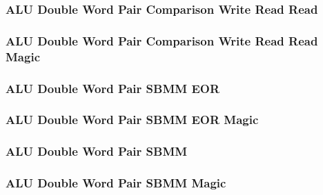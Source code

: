 \subsubsection[{\small ALU Double Word Pair Comparison Write Read Read}]{ALU Double Word Pair Comparison Write Read Read} \label{sec:format-ALU-DPCWRR}



\subsubsection[{\small ALU Double Word Pair Comparison Write Read Read Magic}]{ALU Double Word Pair Comparison Write Read Read Magic} \label{sec:format-ALU-DPCWRR.M}



\subsubsection[{\small ALU Double Word Pair SBMM EOR}]{ALU Double Word Pair SBMM EOR} \label{sec:format-ALU-DPSBMME}



\subsubsection[{\small ALU Double Word Pair SBMM EOR Magic}]{ALU Double Word Pair SBMM EOR Magic} \label{sec:format-ALU-DPSBMME.M}



\subsubsection[{\small ALU Double Word Pair SBMM}]{ALU Double Word Pair SBMM} \label{sec:format-ALU-DPSBMM}



\subsubsection[{\small ALU Double Word Pair SBMM Magic}]{ALU Double Word Pair SBMM Magic} \label{sec:format-ALU-DPSBMM.M}


